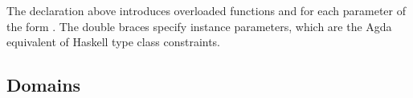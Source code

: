 \begin{AgdaAlign}
\begin{code}
\>[63]\<%
\\
\>[0]\AgdaSpace{}%
\AgdaSpace{}%
%
\>[31]\AgdaSpace{}%
\AgdaSymbol{(}\AgdaSymbol{;}\AgdaSpace{}%
\AgdaSymbol{;}\AgdaSpace{}%
\AgdaSymbol{)}%
\>[63]\<%
\\
\>[0]\AgdaSpace{}%
\AgdaSpace{}%
\AgdaSymbol{\{\{}\AgdaSpace{}%
\AgdaSpace{}%
\AgdaSymbol{\}\}}%
\>[31]\AgdaSpace{}%
\AgdaSymbol{(}\AgdaSymbol{;}\AgdaSpace{}%
\AgdaSymbol{)}%
\>[63]\<%
\end{code}
%
The declaration  above introduces overloaded functions
 and  for each parameter of the form .
The double braces specify instance parameters,
which are the Agda equivalent of Haskell type class constraints.

\subsection{Domains}


\end{AgdaAlign}
